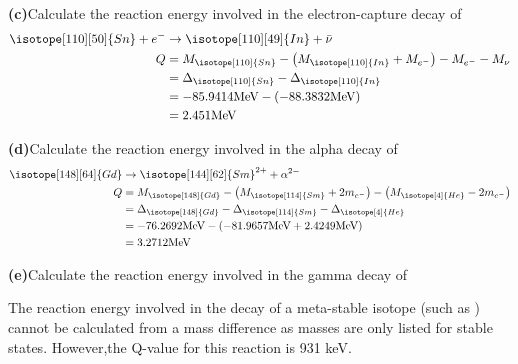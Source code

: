 \documentclass[11pt]{article}
\renewcommand{\part}[1] {\vspace{.10in} {\bf (#1)}}
\newcommand{\iso}{\isotope}
\begin{document}
\part{c}{Calculate the reaction energy involved in the electron-capture decay of \iso[111]{Sn}}
\begin{align}
	\iso[110][50]{Sn} + e^{-} &\to \iso[110][49]{In} + \bar{\nu} \notag \\
	Q &= M_{\iso[110]{Sn}} - \left (M_{\iso[110]{In}} + M_{e^{-}} \right ) - M_{e^{-}} -M_{\nu} \notag \\
	  &= \Delta_{\iso[110]{Sn}} - \Delta_{\iso[110]{In}} \notag \\
	  &= -85.9414\text{MeV} - \left (-88.3832\text{MeV} \right ) \notag \\
	  &= 2.451\text{MeV}
\end{align}

\part{d}{Calculate the reaction energy involved in the alpha decay of \iso[148]{Gd}}
\begin{align}
	\iso[148][64]{Gd} &\to \iso[144][62]{Sm}^{2+} +\alpha^{2-} \notag \\
	Q &= M_{\iso[148]{Gd}} - \left (M_{\iso[114]{Sm}}  + 2m_{e^{-}} \right ) - \left ( M_{\iso[4]{He}} - 2m_{e^{-}} \right ) \notag \\
	  &= \Delta_{\iso[148]{Gd}} - \Delta_{\iso[114]{Sm}} - \Delta_{\iso[4]{He}} \notag \\
	  &= -76.2692\text{MeV} -\left (-81.9657\text{MeV} + 2.4249\text{MeV} \right ) \notag \\
	  &= 3.2712\text{MeV}
\end{align}

\part{e}{Calculate the reaction energy involved in the gamma decay of \iso[107m]{Ag}}

The reaction energy involved in the decay of a meta-stable isotope (such as \iso[107m]{Ag}) cannot be calculated from a mass difference as masses are only listed for stable states. 
However,the Q-value for this reaction is 931 keV. 
\end{document}

